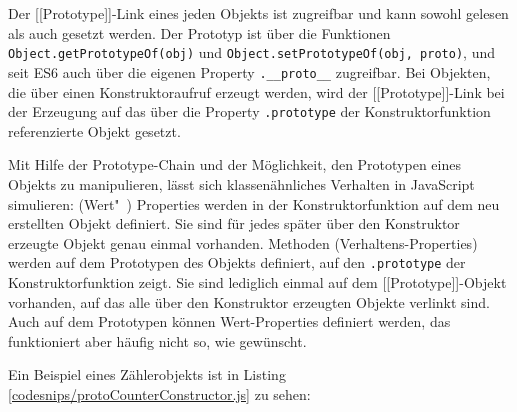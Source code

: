

Der [[Prototype]]-Link eines jeden Objekts ist zugreifbar und kann sowohl gelesen als auch gesetzt werden. Der Prototyp ist über die Funktionen \texttt{Object.get\-Proto\-typeOf(obj)} und \texttt{Object.setProto\-typeOf(obj, proto)}, und seit ES6 auch über die eigenen Property \texttt{.\_\_proto\_\_} zugreifbar. Bei Objekten, die über einen Konstruktoraufruf erzeugt werden, wird der [[Prototype]]-Link bei der Erzeugung auf das über die Property \texttt{.prototype} der Konstruktorfunktion referenzierte Objekt gesetzt.

Mit Hilfe der Prototype-Chain und der Möglichkeit, den Prototypen eines Objekts zu manipulieren, lässt sich klassenähnliches Verhalten in JavaScript simulieren: (Wert"~) Pro\-per\-ties werden in der Konstruktorfunktion auf dem neu erstellten Objekt definiert. Sie sind für jedes später über den Konstruktor erzeugte  Objekt genau einmal vorhanden. Methoden (Verhaltens-Properties) werden auf dem Prototypen des Objekts definiert, auf den \texttt{.prototype} der Konstruktorfunktion zeigt. Sie sind lediglich einmal auf dem [[Prototype]]-Objekt vorhanden, auf das alle über den Konstruktor erzeugten Objekte verlinkt sind. Auch auf dem Prototypen können Wert-Properties definiert werden, das funktioniert aber häufig nicht so, wie gewünscht.

Ein Beispiel eines Zählerobjekts ist in Listing \ref{codesnips/protoCounterConstructor.js} zu sehen:

